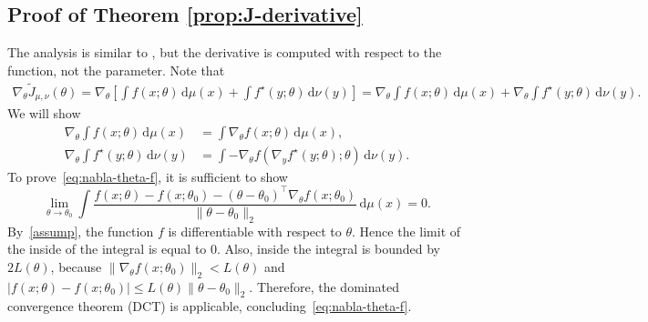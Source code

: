 \documentclass[10pt]{article}
\newcommand{\ud}{\,\mathrm{d}}
\newcommand{\norm}[1]{\|#1\|}
\renewcommand{\tilde}{\widetilde}
\numberwithin{equation}{section}
\begin{document}
\subsection{Proof of Theorem \ref{prop:J-derivative}} \label{apdx:J-derivative}
	The analysis is similar to \citet{chartrand2009gradient}, but the derivative is computed with respect to the function, not the parameter. 
	Note that
	\begin{align*}
	\nabla_\theta \tilde{J}_{\mu,\nu}(\theta) 
	= \nabla_\theta \left[\int f(x;\theta)\ud \mu(x) + \int f^\star(y;\theta) \ud \nu(y)\right]
	=\nabla_\theta \int f(x;\theta)\ud \mu(x) + \nabla_\theta \int f^\star(y;\theta) \ud \nu(y).
	\end{align*}
	We will show 
	\begin{align}
	\nabla_\theta \int f(x;\theta)\ud \mu(x) &= \int \nabla_\theta f(x;\theta)\ud \mu(x)\label{eq:nabla-theta-f},
	\\ \nabla_\theta \int f^\star(y;\theta) \ud \nu(y)&=\int -\nabla_\theta f(\nabla_y f^\star(y;\theta);\theta)\ud \nu(y).\label{eq:nabla-theta-f-star}
	\end{align}
	To prove~\eqref{eq:nabla-theta-f}, it is sufficient to show
	\begin{equation*}
	\lim_{\theta \to \theta_0}\int \frac{f(x;\theta)-f(x;\theta_0) - (\theta-\theta_0)^\top \nabla_\theta f(x;\theta_0)}{\norm{\theta - \theta_0}_2}\ud \mu(x) = 0.
	\end{equation*}
	By~\autoref{assump}, the function $f$ is differentiable with respect to $\theta$. Hence the limit of the inside of the integral is equal to $0$. Also, inside the integral is bounded by $2L(\theta)$, because $\|\nabla_\theta f(x;\theta_0)\|_2<L(\theta)$ and $|f(x;\theta)-f(x;\theta_0)|\leq L(\theta)\|\theta - \theta_0\|_2$. Therefore, the dominated convergence theorem (DCT) is applicable, concluding~\eqref{eq:nabla-theta-f}.
	
\end{document}
